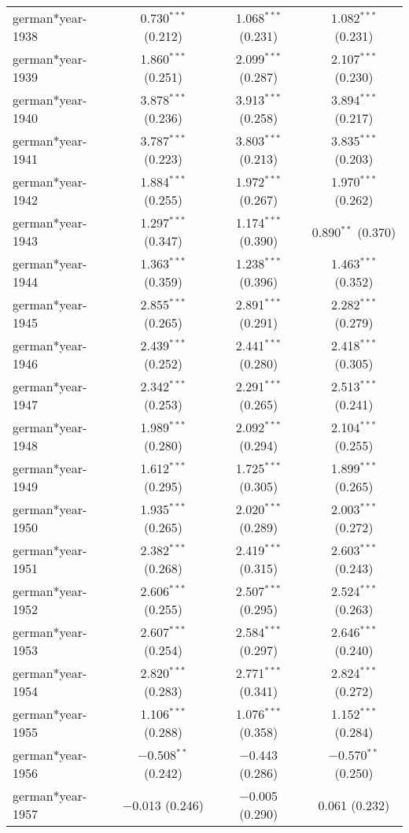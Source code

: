 \begin{table}[!h]
\begin{tabular}{@{\extracolsep{5pt}}lccc}
  german*year-1938 & 0.730$^{***}$ (0.212) & 1.068$^{***}$ (0.231) & 1.082$^{***}$ (0.231) \\ 
  german*year-1939 & 1.860$^{***}$ (0.251) & 2.099$^{***}$ (0.287) & 2.107$^{***}$ (0.230) \\ 
  german*year-1940 & 3.878$^{***}$ (0.236) & 3.913$^{***}$ (0.258) & 3.894$^{***}$ (0.217) \\ 
  german*year-1941 & 3.787$^{***}$ (0.223) & 3.803$^{***}$ (0.213) & 3.835$^{***}$ (0.203) \\ 
  german*year-1942 & 1.884$^{***}$ (0.255) & 1.972$^{***}$ (0.267) & 1.970$^{***}$ (0.262) \\ 
  german*year-1943 & 1.297$^{***}$ (0.347) & 1.174$^{***}$ (0.390) & 0.890$^{**}$ (0.370) \\ 
  german*year-1944 & 1.363$^{***}$ (0.359) & 1.238$^{***}$ (0.396) & 1.463$^{***}$ (0.352) \\ 
  german*year-1945 & 2.855$^{***}$ (0.265) & 2.891$^{***}$ (0.291) & 2.282$^{***}$ (0.279) \\ 
  german*year-1946 & 2.439$^{***}$ (0.252) & 2.441$^{***}$ (0.280) & 2.418$^{***}$ (0.305) \\ 
  german*year-1947 & 2.342$^{***}$ (0.253) & 2.291$^{***}$ (0.265) & 2.513$^{***}$ (0.241) \\ 
  german*year-1948 & 1.989$^{***}$ (0.280) & 2.092$^{***}$ (0.294) & 2.104$^{***}$ (0.255) \\ 
  german*year-1949 & 1.612$^{***}$ (0.295) & 1.725$^{***}$ (0.305) & 1.899$^{***}$ (0.265) \\ 
  german*year-1950 & 1.935$^{***}$ (0.265) & 2.020$^{***}$ (0.289) & 2.003$^{***}$ (0.272) \\ 
  german*year-1951 & 2.382$^{***}$ (0.268) & 2.419$^{***}$ (0.315) & 2.603$^{***}$ (0.243) \\ 
  german*year-1952 & 2.606$^{***}$ (0.255) & 2.507$^{***}$ (0.295) & 2.524$^{***}$ (0.263) \\ 
  german*year-1953 & 2.607$^{***}$ (0.254) & 2.584$^{***}$ (0.297) & 2.646$^{***}$ (0.240) \\ 
  german*year-1954 & 2.820$^{***}$ (0.283) & 2.771$^{***}$ (0.341) & 2.824$^{***}$ (0.272) \\ 
  german*year-1955 & 1.106$^{***}$ (0.288) & 1.076$^{***}$ (0.358) & 1.152$^{***}$ (0.284) \\ 
  german*year-1956 & $-$0.508$^{**}$ (0.242) & $-$0.443 (0.286) & $-$0.570$^{**}$ (0.250) \\ 
  german*year-1957 & $-$0.013 (0.246) & $-$0.005 (0.290) & 0.061 (0.232) \\ 

\end{tabular}
\end{table}
